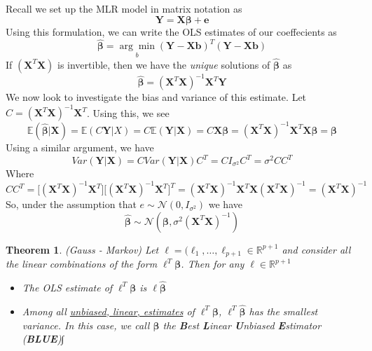 \documentclass[12pt]{article}  %
\newcommand{\R}{{\mathbb{R}}}
\newcommand{\E}{{\mathbb{E}}}
\newcommand{\bb}{{\boldsymbol{\beta}}}
\newtheorem{theorem}{Theorem}
\begin{document}
Recall we set up the MLR model in matrix notation as 
\begin{equation}
\mathbf{Y} = \mathbf{X}\boldsymbol{\beta} + \mathbf{e}
\end{equation}
Using this formulation, we can write the OLS estimates of our coeffecients as \begin{equation}
\widehat{\boldsymbol{\beta}} = \underset{b}{\arg\min}(\mathbf{\mathbf{Y}-\mathbf{Xb}})^{T}(\mathbf{\mathbf{Y}-\mathbf{Xb}})
\end{equation}
If $(\mathbf{X}^{T}\mathbf{X})$ is invertible, then we have the \textit{unique} solutions of $\widehat{\boldsymbol{\beta}}$ as 
\begin{equation}
\widehat{\boldsymbol{\beta}} = (\mathbf{X}^{T}\mathbf{X})^{-1}\mathbf{X}^{T}\mathbf{Y}
\end{equation}
We now look to investigate the bias and variance of this estimate. Let $C = (\mathbf{X}^{T}\mathbf{X})^{-1}\mathbf{X}^{T}$. Using this, we see $$\E(\widehat{\bb}|\mathbf{X}) = \E(C\mathbf{Y}|X) = C\E(\mathbf{Y}|\mathbf{X}) = C\mathbf{X}\bb = (\mathbf{X}^{T}\mathbf{X})^{-1}\mathbf{X}^{T}\mathbf{X}\bb = \bb$$
Using a similar argument, we have $$Var(\mathbf{Y}|\mathbf{X}) = CVar(\mathbf{Y}|\mathbf{X})C^{T} = CI_{\sigma^2}C^{T} = \sigma^2CC^{T}$$ Where $$CC^{T} = \Big[(\mathbf{X}^{T}\mathbf{X})^{-1}\mathbf{X}^{T}\Big]\Big[(\mathbf{X}^{T}\mathbf{X})^{-1}\mathbf{X}^{T}\big]^{T} = (\mathbf{X}^{T}\mathbf{X})^{-1}\mathbf{X}^{T}\mathbf{X}(\mathbf{X}^{T}\mathbf{X})^{-1} = (\mathbf{X}^{T}\mathbf{X})^{-1}$$
So, under the assumption that $e\sim \mathcal{N}(0,I_{\sigma^2})$ we have 
\begin{equation} 
\widehat{\bb} \sim\mathcal{N}(\bb,\sigma^{2}(\mathbf{X}^{T}\mathbf{X})^{-1})
\end{equation}

\begin{theorem}
(Gauss - Markov) Let $\ell = (\ell_1, \ldots, \ell_{p+1}\in\R^{p+1}$ and consider all the linear combinations of the form $\ell^{T}\bb$. Then for any $\ell\in\R^{p+1}$\begin{itemize}
\item The OLS estimate of $\ell^{T}\bb$ is $\ell\widehat{\bb}$ 
\item Among all \underline{unbiased, linear, estimates} of $\ell^{T}\bb$, $\ell^{T}\widehat{\bb}$ has the smallest variance. In this case, we call $\widehat{\bb}$ the \textbf{B}est \textbf{L}inear \textbf{U}nbiased \textbf{E}stimator (\textbf{BLUE})∫
\end{itemize} 
\end{theorem}
\end{document}

